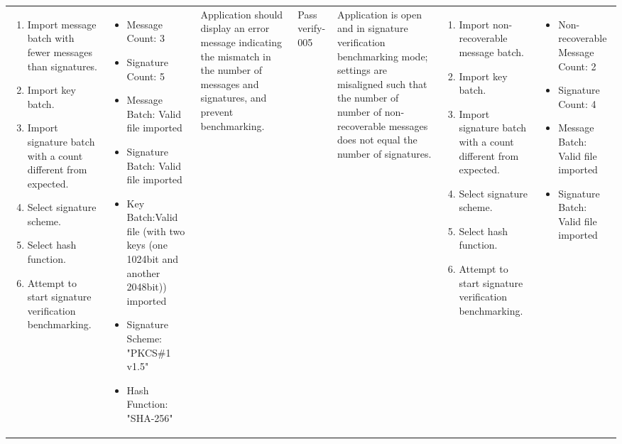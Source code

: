 \documentclass[]{final_report}
\theoremstyle{definition}
\begin{document}
\begin{longtable}{|l|p{2.5cm}|p{2.8cm}|p{3cm}|p{2cm}|p{1.5cm}|}
\begin{enumerate}
\item Import message batch with fewer messages than signatures.
\item Import key batch.
\item Import signature batch with a count different from expected.
\item Select signature scheme.
\item Select hash function.
\item Attempt to start signature verification benchmarking.
\end{enumerate} &
\begin{itemize}
\item Message Count: 3
\item Signature Count: 5
\item Message Batch: Valid file imported
\item Signature Batch: Valid file imported
\item Key Batch:Valid file  (with two keys (one 1024bit and another 2048bit)) imported 
\item Signature Scheme: "PKCS\#1 v1.5"
\item Hash Function: "SHA-256"
\end{itemize} &
Application should display an error message indicating the mismatch in the number of messages and signatures, and prevent benchmarking. & Pass \
\hline
verify-005 & Application is open and in signature verification benchmarking mode; settings are misaligned such that the number of number of non-recoverable messages does not equal the number of signatures. &
\begin{enumerate}
\item Import non-recoverable message batch.
\item Import key batch.
\item Import signature batch with a count different from expected.
\item Select signature scheme.
\item Select hash function.
\item Attempt to start signature verification benchmarking.
\end{enumerate} &
\begin{itemize}
\item Non-recoverable Message Count: 2
\item Signature Count: 4
\item Message Batch: Valid file imported
\item Signature Batch: Valid file imported

\end{itemize}
\end{longtable}
\end{document}
